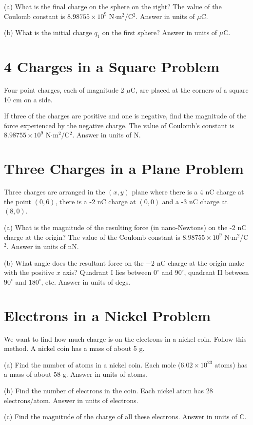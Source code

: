\documentclass[../physics12.tex]{subfiles}
\begin{document}
(a) What is the final charge on the sphere on the right? The value of the Coulomb constant is $8.98755\times 10^9$ N$\cdot$m$^2$/C$^2$. Answer in units of $\mu$C.

(b) What is the initial charge $q_1$ on the first sphere? Answer in units of $\mu$C.

\section{4 Charges in a Square Problem}
Four point charges, each of magnitude 2 $\mu$C, are placed at the corners of a square 10 cm on a side. 

If three of the charges are positive and one is negative, find the magnitude of the force experienced by the negative charge. 
The value of Coulomb's constant is $8.98755\times 10^9$ N$\cdot$m$^2$/C$^2$. Answer in units of N.

\section{Three Charges in a Plane Problem}
Three charges are arranged in the $(x,y)$ plane where there is a 4 nC charge at the point $(0,6)$, there is a -2 nC charge at $(0,0)$ and a -3 nC charge at $(8,0)$.

(a) What is the magnitude of the resulting force (in nano-Newtons) on the -2 nC charge at the origin? The value of the Coulomb constant is $8.98755\times 10^9$ N$\cdot$m$^2$/C$^2$. Answer in units of nN. 

(b) What angle does the resultant force on the $-2$ nC charge at the origin make with the positive $x$ axis? Quadrant I lies between $0^{\circ}$ and $90^{\circ}$, quadrant II between $90^{\circ}$ and $180^{\circ}$, etc. Answer in units of degs.

\section{Electrons in a Nickel Problem}
We want to find how much charge is on the electrons in a nickel coin. Follow this method. A nickel coin has a mass of about 5 g.

(a) Find the number of atoms in a nickel coin. Each mole ($6.02\times 10^{23}$ atoms) has a mass of about 58 g. Answer in units of atoms.

(b) Find the number of electrons in the coin. Each nickel atom has 28 electrons/atom. Answer in units of electrons.

(c) Find the magnitude of the charge of all these electrons. Answer in units of C.
\end{document}
